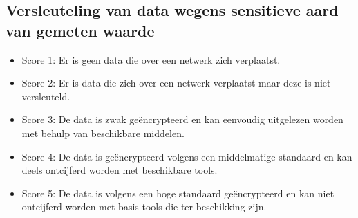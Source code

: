 \subsection{Versleuteling van data wegens sensitieve aard van gemeten waarde}

\begin{itemize}
    \item Score 1: Er is geen data die over een netwerk zich verplaatst.
    \item Score 2: Er is data die zich over een netwerk verplaatst maar deze is niet versleuteld.
    \item Score 3: De data is zwak geëncrypteerd en kan eenvoudig uitgelezen worden met behulp van beschikbare middelen.
    \item Score 4: De data is geëncrypteerd volgens een middelmatige standaard en kan deels ontcijferd worden met beschikbare tools.
    \item Score 5: De data is volgens een hoge standaard geëncrypteerd en kan niet ontcijferd worden met basis tools die ter beschikking zijn.  
\end{itemize}